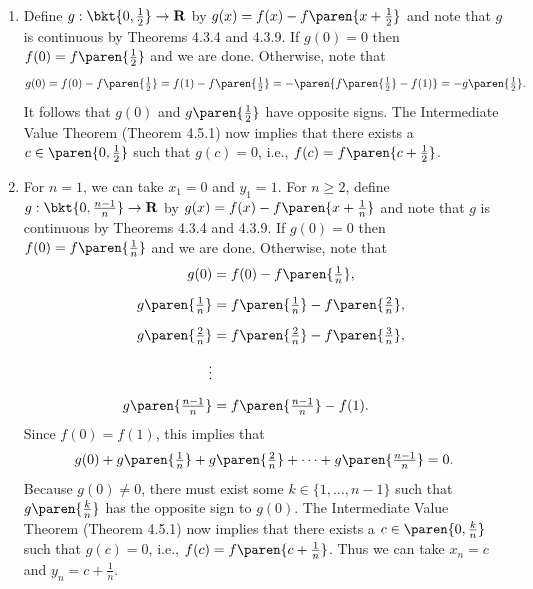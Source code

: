 \documentclass{lew98_solutions}
\begin{document}
\begin{solution}
    \begin{enumerate}
        \item Define \( g : \bkt{0, \tfrac{1}{2}} \to \R \) by \( g(x) = f(x) - f \paren{x + \tfrac{1}{2}} \) and note that \( g \) is continuous by Theorems 4.3.4 and 4.3.9. If \( g(0) = 0 \) then \( f(0) = f \paren{\tfrac{1}{2}} \) and we are done. Otherwise, note that
        \[
            g(0) = f(0) - f \paren{\tfrac{1}{2}} = f(1) - f \paren{\tfrac{1}{2}} = -\paren{f \paren{\tfrac{1}{2}} - f(1)} = -g \paren{\tfrac{1}{2}}.
        \]
        It follows that \( g(0) \) and \( g \paren{ \tfrac{1}{2} } \) have opposite signs. The Intermediate Value Theorem (Theorem 4.5.1) now implies that there exists a \( c \in \paren{ 0, \tfrac{1}{2} } \) such that \( g(c) = 0 \), i.e., \( f(c) = f \paren{ c + \tfrac{1}{2} } \).

        \item For \( n = 1 \), we can take \( x_1 = 0 \) and \( y_1 = 1 \). For \( n \geq 2 \), define \( g : \bkt{0, \tfrac{n-1}{n}} \to \R \) by \( g(x) = f(x) - f \paren{x + \tfrac{1}{n}} \) and note that \( g \) is continuous by Theorems 4.3.4 and 4.3.9. If \( g(0) = 0 \) then \( f(0) = f \paren{\tfrac{1}{n}} \) and we are done. Otherwise, note that
        \begin{align*}
            g(0) &= f(0) - f \paren{\tfrac{1}{n}}, \\[2mm]
            g \paren{\tfrac{1}{n}} &= f \paren{\tfrac{1}{n}} - f \paren{\tfrac{2}{n}}, \\[2mm]
            g \paren{\tfrac{2}{n}} &= f \paren{\tfrac{2}{n}} - f \paren{\tfrac{3}{n}}, \\[2mm]
            \vdots & \\[2mm]
            g \paren{\tfrac{n-1}{n}} &= f \paren{\tfrac{n-1}{n}} - f(1).
        \end{align*}
        Since \( f(0) = f(1) \), this implies that
        \[
            g(0) + g \paren{\tfrac{1}{n}} + g \paren{\tfrac{2}{n}} + \cdots + g \paren{\tfrac{n-1}{n}} = 0.
        \]
        Because \( g(0) \neq 0 \), there must exist some \( k \in \{ 1, \ldots, n - 1 \} \) such that \( g \paren{\tfrac{k}{n}} \) has the opposite sign to \( g(0) \). The Intermediate Value Theorem (Theorem 4.5.1) now implies that there exists a \( c \in \paren{0, \tfrac{k}{n}} \) such that \( g(c) = 0 \), i.e., \( f(c) = f \paren{c + \tfrac{1}{n}} \). Thus we can take \( x_n = c \) and \( y_n = c + \tfrac{1}{n} \).


\end{enumerate}
\end{solution}
\end{document}
